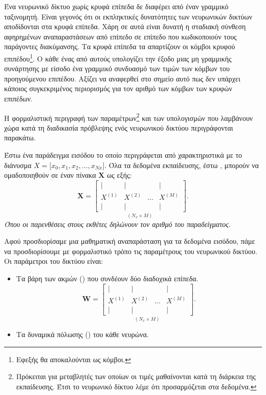 Ένα νευρωνικό δίκτυο χωρίς κρυφά επίπεδα δε διαφέρει από έναν γραμμικό ταξινομητή. Είναι γεγονός ότι οι εκπληκτικές δυνατότητες των νευρωνικών δικτύων αποδίδονται στα κρυφά επίπεδα. Χάρη σε αυτά είναι δυνατή η σταδιακή σύνθεση αφηρημένων αναπαραστάσεων από επίπεδο σε επίπεδο που κωδικοποιούν τους παράγοντες διακύμανσης. Τα κρυφά επίπεδα τα απαρτίζουν οι κόμβοι κρυφού επιπέδου\footnote{Εφεξής θα αποκαλούνται ως κόμβοι.}. Ο κάθε ένας από αυτούς υπολογίζει την έξοδο μιας μη γραμμικής συνάρτησης με είσοδο ένα γραμμικό συνδυασμό των τιμών των κόμβων του προηγούμενου επιπέδου. Αξίζει να αναφερθεί στο σημείο αυτό πως δεν υπάρχει κάποιος συγκεκριμένος περιορισμός για τον αριθμό των κόμβων των κρυφών επιπέδων. \par

Η φορμαλιστική περιγραφή των παραμέτρων\footnote{Πρόκειται για μεταβλητές των οποίων οι τιμές μαθαίνονται κατά τη διάρκεια της εκπαίδευσης. Έτσι το νευρωνικό δίκτυο λέμε ότι προσαρμόζεται στα δεδομένα.} και των υπολογισμών που λαμβάνουν χώρα κατά τη διαδικασία πρόβλεψης ενός νευρωνικού δικτύου περιγράφονται παρακάτω. \par

Έστω ένα παράδειγμα εισόδου το οποίο περιγράφεται από  χαρακτηριστικά με το διάνυσμα \(X = \big[x_0, x_1, x_2, \dots, x_{Nx}]\). Όλα τα δεδομένα εκπαίδευσης, έστω , μπορούν να ομαδοποιηθούν σε έναν πίνακα $\boldsymbol{X}$ ως εξής: 
\begin{equation}
    \boldsymbol{X} =
    \underset{(N_x \times M)}{\begin{bmatrix}
        |&|&&| \\
        X^{(1)} & X^{(2)} & \dots & X^{(M)}\\
        |&|&&|
    \end{bmatrix}}.
\end{equation}
\textit{Όπου οι παρενθέσεις στους εκθέτες δηλώνουν τον αριθμό του παραδείγματος.}\par

Αφού προσδιορίσαμε μια μαθηματική αναπαράσταση για τα δεδομένα εισόδου, πάμε να προσδιορίσουμε με φορμαλιστικό τρόπο τις παραμέτρους του νευρωνικού δικτύου. Οι παράμετροι του δικτύου είναι:
\begin{itemize}
    \item Τα βάρη των ακμών () που συνδέουν δύο διαδοχικά επίπεδα.\\
    \begin{equation}
        \boldsymbol{W} =
        \underset{(N_x \times M)}{\begin{bmatrix}
            |&|&&| \\
            X^{(1)} & X^{(2)} & \dots & X^{(M)}\\
            |&|&&|
        \end{bmatrix}}.
    \end{equation}
    \item Τα δυναμικά πόλωσης () του κάθε νευρώνα.
\end{itemize}

